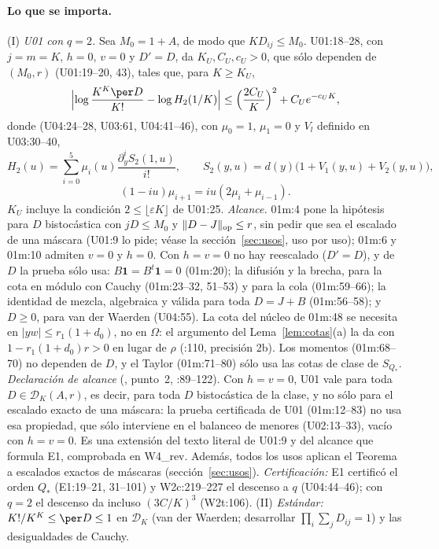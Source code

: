\paragraph{Lo que se importa.} (I) \emph{U01 con $q=2$.} Sea $M_0=1+A$, de modo que $KD_{ij}\le M_0$.
U01:18--28, con $j=m=K$, $h=0$, $v=0$ y $D'=D$, da $K_U,C_U,c_U>0$, que sólo dependen de $(M_0,r)$
(U01:19--20, 43), tales que, para $K\ge K_U$,
\begin{equation}\label{eq:u01}
 \Bigl|\log\frac{K^K\per D}{K!}-\log H_2(1/K)\Bigr|\le\Bigl(\frac{2C_U}K\Bigr)^2+C_Ue^{-c_UK},
\end{equation}
donde (U04:24--28, U03:61, U04:41--46), con $\mu_0=1$, $\mu_1=0$ y $V_l$ definido en U03:30--40,
\[
 H_2(u)=\sum_{i=0}^5\mu_i(u)\frac{\partial_y^iS_2(1,u)}{i!},\qquad
 S_2(y,u)=d(y)\bigl(1+V_1(y,u)+V_2(y,u)\bigr),
\]
\[
 (1-iu)\mu_{i+1}=iu(2\mu_i+\mu_{i-1}).
\]
$K_U$ incluye la condición $2\le\lfloor\varepsilon K\rfloor$ de U01:25.
\emph{Alcance.} 01m:4 pone la hipótesis para $D$ bistocástica con $jD\le M_0$ y
$\|D-J\|_{\rm op}\le r$, sin pedir que sea el escalado de una máscara (U01:9 lo pide; véase la
sección~\ref{sec:usos}, uso por uso); 01m:6 y 01m:10 admiten $v=0$ y $h=0$. Con $h=v=0$ no hay
reescalado ($D'=D$), y de $D$ la prueba sólo usa: $B\mathbf1=B^t\mathbf1=0$ (01m:20); la difusión
y la brecha, para la cota en módulo con Cauchy (01m:23--32, 51--53) y para la cola (01m:59--66);
la identidad de mezcla, algebraica y válida para toda $D=J+B$ (01m:56--58); y $D\ge0$, para van
der Waerden (U04:55). La cota del núcleo de 01m:48 se necesita en $|yw|\le r_1(1+d_0)$, no en
$\Omega$: el argumento del Lema~\ref{lem:cotas}(a) la da con $1-r_1(1+d_0)r>0$ en lugar de $\rho$
(:110, precisión 2b). Los momentos (01m:68--70) no dependen de $D$, y el
Taylor (01m:71--80) sólo usa las cotas de clase de $S_{Q_*}$.
\emph{Declaración de alcance} (, punto~2, :89--122). Con $h=v=0$, U01 vale para
toda $D\in\mathcal D_K(A,r)$, es decir, para toda $D$ bistocástica de la clase, y no sólo para el
escalado exacto de una máscara: la prueba certificada de U01 (01m:12--83) no usa esa propiedad,
que sólo interviene en el balanceo de menores (U02:13--33), vacío con $h=v=0$. Es una extensión
del texto literal de U01:9 y del alcance que formula E1, comprobada en W4\_rev. Además, todos los
usos aplican el Teorema a escalados exactos de máscaras (sección~\ref{sec:usos}).
\emph{Certificación:} E1 certificó el orden $Q_*$ (E1:19--21, 31--101) y
W2c:219--227 el descenso a $q$ (U04:44--46); con $q=2$ el descenso da incluso $(3C/K)^3$ (W2t:106).
(II) \emph{Estándar:} $K!/K^K\le\per D\le1$ en $\mathcal D_K$ (van der Waerden; desarrollar
$\prod_i\sum_jD_{ij}=1$) y las desigualdades de Cauchy.


